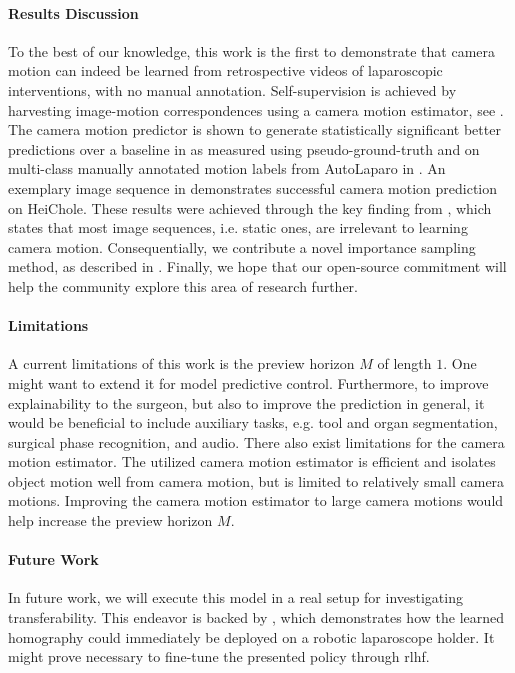 \paragraph{Results Discussion} To the best of our knowledge, this work is the first
to demonstrate that camera motion can indeed be learned from 
retrospective
videos of laparoscopic interventions,
with no manual annotation.
Self-supervision is achieved 
by harvesting image-motion correspondences using a camera motion estimator, see . The camera motion predictor is shown to generate statistically significant better predictions over a baseline in  as measured using pseudo-ground-truth and on multi-class manually annotated motion labels from AutoLaparo in . An exemplary image sequence in  demonstrates successful camera motion prediction on HeiChole. These results were achieved through the key finding from , which states that most image sequences, i.e. static ones, are irrelevant to learning camera motion. Consequentially, we contribute a novel importance sampling method, as described in . Finally, we hope that our open-source commitment will help the community explore this area of research further.

\paragraph{Limitations} A current limitations of this work is the preview horizon $M$ of length $1$. One might want to extend it for model predictive control. Furthermore, to improve explainability to the surgeon, but also to improve the prediction in general, it would be beneficial to include auxiliary tasks, e.g. tool and organ segmentation, surgical phase recognition, and audio. There also exist limitations for the camera motion estimator. The utilized camera motion estimator is efficient and isolates object motion well from camera motion, but is limited to relatively small camera motions. Improving the camera motion estimator to large camera motions would help increase the preview horizon $M$.

\paragraph{Future Work} In future work, we will execute this model in a real setup for investigating transferability. This endeavor is backed by , which demonstrates how the learned homography could immediately be deployed on a robotic laparoscope holder. It  might prove necessary to fine-tune the presented policy through \gls{rlhf}.

